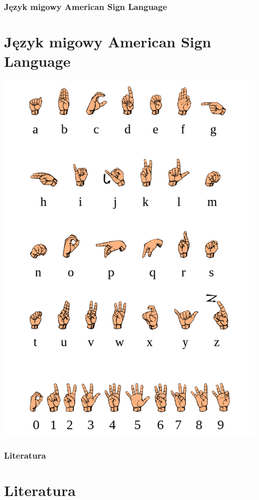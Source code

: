 \documentclass{beamer}
\begin{document}
	\begin{frame}
		\frametitle{Język migowy American Sign Language}
		\section{Język migowy American Sign Language}
		\begin{center}
			\includegraphics[scale=0.25]{Asl}
		\end{center}
	\end{frame}

	\begin{frame}
		\frametitle{Literatura}
		\section{Literatura}
		\printbibliography
	\end{frame}
\end{document}
